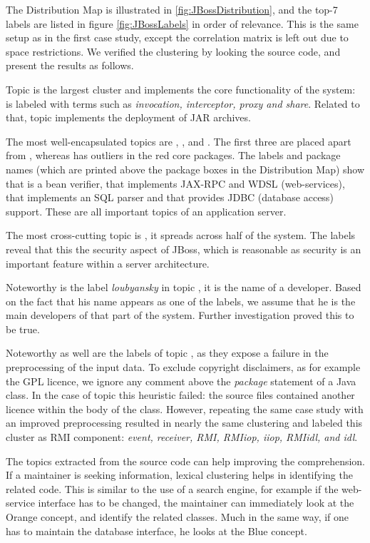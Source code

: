 The Distribution Map is illustrated in \autoref{fig:JBossDistribution}, and the top-7 labels are listed in figure \autoref{fig:JBossLabels} in order of relevance. This is the same setup as in the first case study, except the correlation matrix is left out due to space restrictions. We verified the clustering by looking the source code, and present the results as follows.

Topic \red is the largest cluster and implements the core functionality of the system: is labeled with terms such as \emph{invocation, interceptor, proxy \emph{and} share}. Related to that, topic \cyan implements the deployment of JAR archives.

The most well-encapsulated topics are \darkgreen, \orange, \green and \blue. The first three are placed apart from \red, whereas \blue has outliers in the red core packages. The labels and package names (which are printed above the package boxes in the Distribution Map) show that \darkgreen is a bean verifier, that \orange implements JAX-RPC and WDSL (\eg web-services), that \green implements an SQL parser and that \blue provides JDBC (\eg database access) support. These are all important topics of an application server.

The most cross-cutting topic is \yellow, it spreads across half of the system. The labels reveal that this the security aspect of JBoss, which is reasonable as security is an important feature within a server architecture.

Noteworthy is the label \emph{loubyansky} in topic \blue, it is the name of a developer. Based on the fact that his name appears as one of the labels, we assume that he is the main developers of that part of the system. Further investigation proved this to be true.

Noteworthy as well are the labels of topic \darkgreen, as they expose a failure in the preprocessing of the input data. To exclude copyright disclaimers, as for example the GPL licence, we ignore any comment above the \emph{package} statement of a Java class. In the case of topic \darkgreen this heuristic failed: the source files contained another licence within the body of the class. However, repeating the same case study with an improved preprocessing resulted in nearly the same clustering and labeled this cluster as RMI component: \emph{event, receiver, RMI, RMIiop, iiop, RMIidl, and idl}.

The topics extracted from the source code can help improving the comprehension. If a maintainer is seeking information, lexical clustering helps in identifying the related code. This is similar to the use of a search engine, for example if the web-service interface has to be changed, the maintainer can immediately look at the Orange concept, and identify the related classes. Much in the same way, if one has to maintain the database interface, he looks at the Blue concept.


